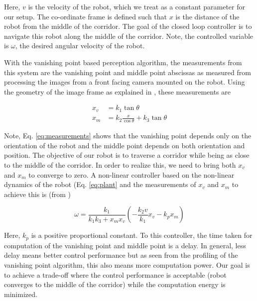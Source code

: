 Here, $v$ is the velocity of the robot, which we treat as a constant parameter for our setup. The co-ordinate frame is defined such that $x$ is the distance of the robot from the middle of the corridor. The goal of the closed loop controller is to navigate this robot along the middle of the corridor. Note, the controlled variable is $\omega$, the desired angular velocity of the robot.

With the vanishing point based perception algorithm, the measurements from this system are the vanishing point and middle point abscissas as measured from processing the images from a front facing camera mounted on the robot. Using the geometry of the image frame as explained in \cite{VP2}, these measurements are

\begin{subequations}
\begin{align}
x_v &= k_1\tan\theta \nonumber \\
x_m &= k_2\frac{x}{\cos\theta} + k_3\tan\theta
\end{align}
\label{eq:measurements}
\end{subequations}

Note, Eq. \ref{eq:measurements} shows that the vanishing point depends only on the orientation of the robot and the middle point depends on both orientation and position. The objective of our robot is to traverse a corridor while being as close to the middle of the corridor. In order to realize this, we need to bring both $x_v$ and $x_m$ to converge to zero. A non-linear controller based on the non-linear dynamics of the robot (Eq. \ref{eq:plant} and the measurements of $x_v$ and $x_m$ to achieve this is (from \cite{VP2})

\begin{equation}
\omega = \frac{k_1}{k_1k_3+x_mx_v}(-\frac{k_2v}{k_1}x_v -k_px_m)
\label{eq:controller}
\end{equation}

Here, $k_p$ is a positive proportional constant. To this controller, the time taken for computation of the vanishing point and middle point is a delay. In general, less delay means better control performance but as seen from the profiling of the vanishing point algorithm, this also means more computation power. Our goal is to achieve a trade-off where the control performance is acceptable (robot converges to the middle of the corridor) while the computation energy is minimized. 









